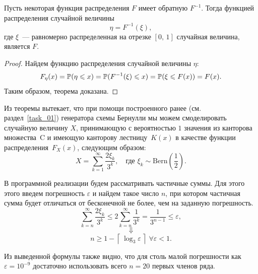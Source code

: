 \begin{theorem}
\label{th:th2-1}
        Пусть некоторая функция распределения $F$ имеет обратную $F^{-1}$. Тогда функцией распределения случайной величины
        $$
                \eta = F^{-1}(\xi),
        $$
        где $\xi$~--- равномерно распределенная на отрезке $[0,\,1]$ случайная величина, является $F$.
\end{theorem}
\begin{proof}
        Найдем функцию распределения случайной величины $\eta$:
        $$
                F_\eta(x) =
                \mathbb{P}(\eta \leqslant x) =
                \mathbb{P}(F^{-1}(\xi) \leqslant x) =
                \mathbb{P}(\xi \leqslant F(x)) =
                F(x).
        $$
        Таким образом, теорема доказана.
\end{proof}

Из теоремы вытекает, что при помощи построенного ранее (см. раздел~\ref{task_01}) генератора схемы Бернулли мы можем смоделировать случайную величину $X$, принимающую с вероятностью $1$ значения из канторова множества~C и имеющую канторову лестницу~$K(x)$ в качестве функции распределения~$F_X(x)$, следующим образом:
$$
        X = \sum_{k = 1}^{\infty}\frac{2\xi_k}{3^k},
        \quad
        \mbox{где $\xi_k\sim\mbox{Bern}\left(\frac12\right)$.}
$$

В программной реализации будем рассматривать частичные суммы. Для этого этого введем погрешность $\varepsilon$ и найдем такое число $n$, при котором частичная сумма будет отличаться от бесконечной не более, чем на заданную погрешность.
$$
        \sum_{k=n}^{\infty} \frac{2\xi_k}{3^k} \leqslant 2\sum_{k=n}^{\infty}\frac{1}{3^k} = \frac{1}{3^{n-1}} \leqslant \varepsilon,
$$
$$
        \Downarrow
$$
$$
        n \geqslant 1 - \left\lceil\,\log_3 \varepsilon\,\right\rceil \; \forall \varepsilon < 1.
$$
\begin{remark}
        Из выведенной формулы также видно, что для столь малой погрешности как $\varepsilon = 10^{-9}$ достаточно использовать всего $n = 20$ первых членов ряда.
\end{remark}


